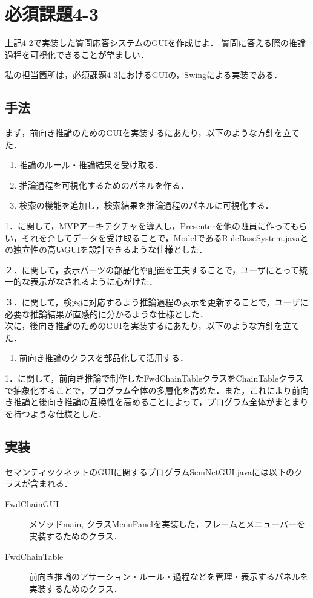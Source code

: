 \documentclass[12pt]{jarticle}
\begin{document}
\section{必須課題4-3}
\begin{screen}
上記4-2で実装した質問応答システムのGUIを作成せよ．
質問に答える際の推論過程を可視化できることが望ましい．
\end{screen}
私の担当箇所は，必須課題4-3におけるGUIの，Swingによる実装である．

\subsection{手法}
まず，前向き推論のためのGUIを実装するにあたり，以下のような方針を立てた．
\begin{enumerate}
\item 推論のルール・推論結果を受け取る．
\item 推論過程を可視化するためのパネルを作る．
\item 検索の機能を追加し，検索結果を推論過程のパネルに可視化する．
\end{enumerate}

1．に関して，MVPアーキテクチャを導入し，Presenterを他の班員に作ってもらい，それを介してデータを受け取ることで，ModelであるRuleBaseSystem.javaとの独立性の高いGUIを設計できるような仕様とした．

２．に関して，表示パーツの部品化や配置を工夫することで，ユーザにとって統一的な表示がなされるように心がけた．

３．に関して，検索に対応するよう推論過程の表示を更新することで，ユーザに必要な推論結果が直感的に分かるような仕様とした． \\

次に，後向き推論のためのGUIを実装するにあたり，以下のような方針を立てた．
\begin{enumerate}
\item 前向き推論のクラスを部品化して活用する．

\end{enumerate}

1．に関して，前向き推論で制作したFwdChainTableクラスをChainTableクラスで抽象化することで，プログラム全体の多層化を高めた．また，これにより前向き推論と後向き推論の互換性を高めることによって，プログラム全体がまとまりを持つような仕様とした．

\subsection{実装}
セマンティックネットのGUIに関するプログラムSemNetGUI.javaには以下のクラスが含まれる．
\begin{description}
\item[FwdChainGUI] メソッドmain, クラスMenuPanelを実装した，フレームとメニューバーを実装するためのクラス．
\item[FwdChainTable] 前向き推論のアサーション・ルール・過程などを管理・表示するパネルを実装するためのクラス．

\end{description}
\end{document}
